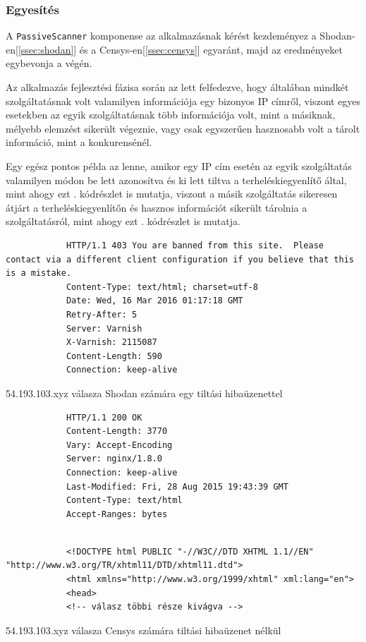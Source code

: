 \subsubsection*{Egyesítés}

	A \texttt{PassiveScanner} komponense az alkalmazásnak kérést kezdeményez a Shodan-en[\ref{ssec:shodan}] és a  Censys-en[\ref{ssec:censys}] egyaránt, majd az eredményeket egybevonja a végén.
	
	Az alkalmazás fejlesztési fázisa során az lett felfedezve, hogy általában mindkét szolgáltatásnak volt valamilyen információja egy bizonyos IP címről, viszont egyes esetekben az egyik szolgáltatásnak több információja volt, mint a másiknak, mélyebb elemzést sikerült végeznie, vagy csak egyszerűen hasznosabb volt a tárolt információ, mint a konkurensénél.
	
	Egy egész pontos példa az lenne, amikor egy IP cím esetén az egyik szolgáltatás valamilyen módon be lett azonosítva és ki lett tiltva a terheléskiegyenlítő által, mint ahogy ezt \az{\ref{shodanban}}. kódrészlet is mutatja, viszont a másik szolgáltatás sikeresen átjárt a terheléskiegyenlítőn és hasznos információt sikerült tárolnia a szolgáltatásról, mint ahogy ezt \az{\ref{censysnoban}}. kódrészlet is mutatja.
	
	\begin{listing}[H]
		\begin{verbatim}
			HTTP/1.1 403 You are banned from this site.  Please contact via a different client configuration if you believe that this is a mistake.
			Content-Type: text/html; charset=utf-8
			Date: Wed, 16 Mar 2016 01:17:18 GMT
			Retry-After: 5
			Server: Varnish
			X-Varnish: 2115087
			Content-Length: 590
			Connection: keep-alive
		\end{verbatim}
		\caption{54.193.103.xyz válasza Shodan számára egy tiltási hibaüzenettel}
		\label{shodanban}
	\end{listing}
		
	\begin{listing}[H]
		\begin{verbatim}
			HTTP/1.1 200 OK
			Content-Length: 3770
			Vary: Accept-Encoding
			Server: nginx/1.8.0
			Connection: keep-alive
			Last-Modified: Fri, 28 Aug 2015 19:43:39 GMT
			Content-Type: text/html
			Accept-Ranges: bytes
		\end{verbatim}
		\vspace{-5pt}
		\begin{verbatim}
			 
			<!DOCTYPE html PUBLIC "-//W3C//DTD XHTML 1.1//EN" "http://www.w3.org/TR/xhtml11/DTD/xhtml11.dtd">
			<html xmlns="http://www.w3.org/1999/xhtml" xml:lang="en">
			<head>
			<!-- válasz többi része kivágva -->
		\end{verbatim}
		\caption{54.193.103.xyz válasza Censys számára tiltási hibaüzenet nélkül}
		\label{censysnoban}
	\end{listing}
	
